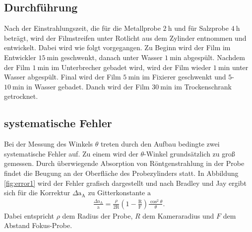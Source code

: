 \subsection{Durchführung}
\label{subsec:durch}
Nach der Einstrahlungszeit, die für die Metallprobe $\SI{2}{\hour}$ und für Salzprobe $\SI{4}{\hour}$ beträgt, wird der Filmstreifen unter Rotlicht
aus dem Zylinder entnommen und entwickelt.
Dabei wird wie folgt vorgegangen.
Zu Beginn wird der Film im Entwickler $\SI{15}{\minute}$ geschwenkt,
danach unter Wasser $\SI{1}{\minute}$ abgespült.
Nachdem der Film $\SI{1}{\minute}$ im Unterbrecher gebadet wird, wird
der Film wieder $\SI{1}{\minute}$ unter Wasser abgespült.
Final wird der Film $\SI{5}{\minute}$ im Fixierer geschwenkt und
$5$-$\SI{10}{\minute}$ in Wasser gebadet.
Danch wird der Film $\SI{30}{\minute}$ im Trockenschrank getrocknet.


\subsection{systematische Fehler}
\label{subsec:systerr}
Bei der Messung des Winkels $\theta$
treten durch den Aufbau bedingte zwei systematische Fehler auf.
Zu einem wird der $\theta$-Winkel grundsätzlich zu groß gemessen.
Durch überwiegende Absorption von Röntgenstrahlung in der Probe
findet die Beugung an der Oberfläche des
Probezylinders statt. In Abbildung \ref{fig:error1} wird
der Fehler grafisch dargestellt und nach Bradley und Jay
ergibt sich für die Korrektur
$\Delta \mathrm{a}_{\mathrm{A}}$
zu Gitterkonstante $\mathrm{a}$
\begin{align}
  \frac{\Delta \mathrm{a}_{\mathrm{A}}}{\mathrm{a}}=\frac{\rho}{2\mathrm{R}}\left(1-\frac{\mathrm{R}}{\mathrm{F}}\right)\frac{\cos^2\theta}{\theta}. \label{eqn:sys1}
\end{align}
Dabei entspricht $\rho$ dem Radius der Probe, $R$ dem Kameraradius
und $F$ dem Abstand Fokus-Probe.

